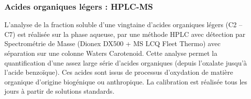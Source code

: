 \subsubsection{Acides organiques légers : HPLC-MS}%
\label{ssub:acides_organiques_légers_hplc_ms}

L’analyse de la fraction soluble d’une vingtaine d’acides organiques légers (C2 – C7) est
réalisée sur la phase aqueuse, par une méthode HPLC avec détection par Spectrométrie de
Masse (Dionex DX500 + MS LCQ Fleet Thermo) avec séparation sur une colonne Waters
Carotenoid. Cette analyse permet la quantification d’une assez large série d'acides
organiques (depuis l’oxalate jusqu’à l’acide benzoïque). Ces acides sont issus de
processus d’oxydation de matière organique d’origine biogénique ou anthropique. La
calibration est réalisée tous les jours à partir de solutions standards.





